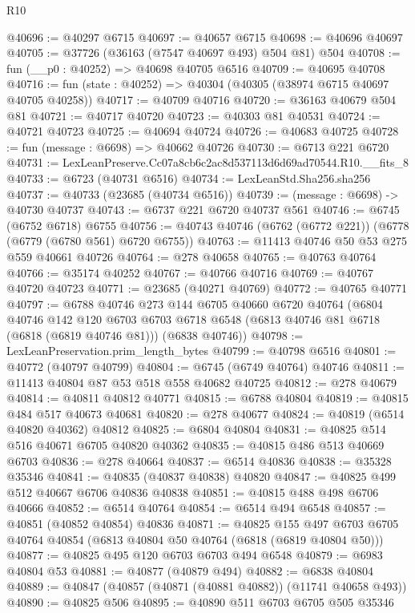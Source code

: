 \begin{lexlean}{R10}
\begin{coremodule}
@40696 := @40297 @6715
@40697 := @40657 @6715
@40698 := @40696 @40697
@40705 := @37726 (@36163 (@7547 @40697 @493) @504 @81) @504
@40708 := fun (__p0 : @40252) => @40698 @40705 @6516
@40709 := @40695 @40708
@40716 := fun (state : @40252) => @40304 (@40305 (@38974 @6715 @40697 @40705 @40258))
@40717 := @40709 @40716
@40720 := @36163 @40679 @504 @81
@40721 := @40717 @40720
@40723 := @40303 @81 @40531
@40724 := @40721 @40723
@40725 := @40694 @40724
@40726 := @40683 @40725
@40728 := fun (message : @6698) => @40662 @40726
@40730 := @6713 @221 @6720
@40731 := LexLeanPreserve.Cc07a8cb6c2ac8d537113d6d69ad70544.R10.__fits_8
@40733 := @6723 (@40731 @6516)
@40734 := LexLeanStd.Sha256.sha256
@40737 := @40733 (@23685 (@40734 @6516))
@40739 := (message : @6698) -> @40730 @40737
@40743 := @6737 @221 @6720 @40737 @561
@40746 := @6745 (@6752 @6718) @6755
@40756 := @40743 @40746 (@6762 (@6772 @221)) (@6778 (@6779 (@6780 @561) @6720 @6755))
@40763 := @11413 @40746 @50 @53 @275 @559 @40661 @40726
@40764 := @278 @40658
@40765 := @40763 @40764
@40766 := @35174 @40252
@40767 := @40766 @40716
@40769 := @40767 @40720 @40723
@40771 := @23685 (@40271 @40769)
@40772 := @40765 @40771
@40797 := @6788
    @40746
    @273
    @144
    @6705
    @40660
    @6720
    @40764
    (@6804
      @40746
      @142
      @120
      @6703
      @6703
      @6718
      @6548
      (@6813 @40746 @81 @6718 (@6818 (@6819 @40746 @81)))
      (@6838 @40746))
@40798 := LexLeanPreservation.prim_length_bytes
@40799 := @40798 @6516
@40801 := @40772 (@40797 @40799)
@40804 := @6745 (@6749 @40764) @40746
@40811 := @11413 @40804 @87 @53 @518 @558 @40682 @40725
@40812 := @278 @40679
@40814 := @40811 @40812 @40771
@40815 := @6788 @40804
@40819 := @40815 @484 @517 @40673 @40681
@40820 := @278 @40677
@40824 := @40819 (@6514 @40820 @40362) @40812
@40825 := @6804 @40804
@40831 := @40825 @514 @516 @40671 @6705 @40820 @40362
@40835 := @40815 @486 @513 @40669 @6703
@40836 := @278 @40664
@40837 := @6514 @40836
@40838 := @35328 @35346
@40841 := @40835 (@40837 @40838) @40820
@40847 := @40825 @499 @512 @40667 @6706 @40836 @40838
@40851 := @40815 @488 @498 @6706 @40666
@40852 := @6514 @40764
@40854 := @6514 @494 @6548
@40857 := @40851 (@40852 @40854) @40836
@40871 := @40825
    @155
    @497
    @6703
    @6705
    @40764
    @40854
    (@6813 @40804 @50 @40764 (@6818 (@6819 @40804 @50)))
@40877 := @40825 @495 @120 @6703 @6703 @494 @6548
@40879 := @6983 @40804 @53
@40881 := @40877 (@40879 @494)
@40882 := @6838 @40804
@40889 := @40847 (@40857 (@40871 (@40881 @40882)) (@11741 @40658 @493))
@40890 := @40825 @506
@40895 := @40890 @511 @6703 @6705 @505 @35346

\end{coremodule}
\end{lexlean}
